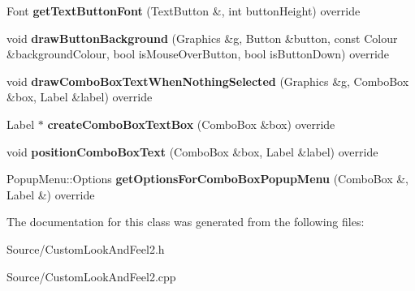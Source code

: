 \begin{DoxyCompactItemize}
Font {\bfseries get\+Text\+Button\+Font} (Text\+Button \&, int button\+Height) override
\item 
\mbox{\label{class_custom_look_and_feel2_ad0fc7274887aeb62b7a265f5d867bcdb}} 
void {\bfseries draw\+Button\+Background} (Graphics \&g, Button \&button, const Colour \&background\+Colour, bool is\+Mouse\+Over\+Button, bool is\+Button\+Down) override
\item 
\mbox{\label{class_custom_look_and_feel2_a2c6b8634c16d4f490471a0ba81e46363}} 
void {\bfseries draw\+Combo\+Box\+Text\+When\+Nothing\+Selected} (Graphics \&g, Combo\+Box \&box, Label \&label) override
\item 
\mbox{\label{class_custom_look_and_feel2_acfc84f483c6ab4e30217501ec3737578}} 
Label $\ast$ {\bfseries create\+Combo\+Box\+Text\+Box} (Combo\+Box \&box) override
\item 
\mbox{\label{class_custom_look_and_feel2_a49d6b5f296cfe8442a6c9cf3a115ccf5}} 
void {\bfseries position\+Combo\+Box\+Text} (Combo\+Box \&box, Label \&label) override
\item 
\mbox{\label{class_custom_look_and_feel2_af348796729b475717a9b2d0999d27bcd}} 
Popup\+Menu\+::\+Options {\bfseries get\+Options\+For\+Combo\+Box\+Popup\+Menu} (Combo\+Box \&, Label \&) override
\end{DoxyCompactItemize}


The documentation for this class was generated from the following files\+:\begin{DoxyCompactItemize}
\item 
Source/Custom\+Look\+And\+Feel2.\+h\item 
Source/Custom\+Look\+And\+Feel2.\+cpp\end{DoxyCompactItemize}
